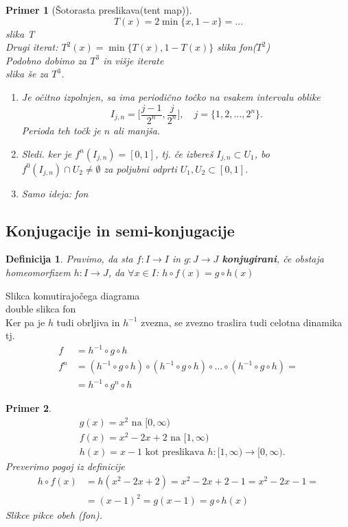 \documentclass{article}
\newtheorem{definicija}{Definicija}
\newtheorem{primer}{Primer}
\begin{document}
\begin{primer}[Šotorasta preslikava(tent map)]
$$
T(x) = 2\min\{x, 1 - x\} = ...
$$
slika T \\ 
Drugi iterat: $T^2(x) = \min\{T(x), 1 - T(x)\}$
slika fon($T^2$) \\ 
Podobno dobimo za $T^3$ in višje iterate \\
slika še za $T^3$.
\begin{enumerate}
\item[c1)] Je očitno izpolnjen, sa ima periodično točko na vsakem intervalu oblike 
$$
I_{j, n} = \Big[\frac{j-1}{2^n}, \frac{j}{2^n}\Big], \quad j = \{1, 2, \dots, 2^n\}.
$$
Perioda teh točk je $n$ ali manjša.
\item[ii)] Sledi. ker je $f^n(I_{j,n}) = [0, 1]$, tj.
če izbereš $I_{j, n} \subset U_1$, bo $f^0(I_{j, n}) \cap U_2 \neq \emptyset$ za poljubni odprti $U_1, U_2 \subset [0, 1]$.
\item[c3)] Samo ideja: fon
\end{enumerate}
\end{primer}

\subsection{Konjugacije in semi-konjugacije}

\begin{definicija}
Pravimo, da sta $f: I \rightarrow I$ in $g: J \rightarrow J$ \textbf{konjugirani}, če obstaja homeomorfizem $h:I \rightarrow J$, da $\forall x\in I$: $h \circ f(x) = g\circ h(x) $
\end{definicija}
Slikca komutirajočega diagrama \\ 
double slikca fon\\ 

Ker pa je $h$ tudi obrljiva in $h^{-1}$ zvezna, se zvezno traslira tudi celotna dinamika tj.
\begin{align*}
f &= h^{-1} \circ g \circ h\\ 
f^n &= (h^{-1} \circ g \circ h) \circ (h^{-1} \circ g \circ h) \circ \dots \circ (h^{-1} \circ g \circ h) = \\ 
&= h^{-1} \circ g^n \circ h
\end{align*}

\begin{primer}
\begin{align*}
&g(x) = x^2 \text{ na } [0, \infty) \\ 
&f(x) = x^2 - 2x + 2 \text{ na } [1, \infty) \\ 
&h(x) = x - 1 \text{ kot preslikava } h:[1, \infty) \rightarrow [0, \infty).
\end{align*}
Preverimo pogoj iz definicije 
\begin{align*}
h\circ f(x) &= h(x^2 - 2x + 2) = x^2 -2x + 2 - 1 = x^2 - 2x - 1 = \\ 
&=(x-1)^2 = g(x-1) = g\circ h(x)  
\end{align*}
Slikce pikce obeh (fon).\\ 
\end{primer}
\end{document}
